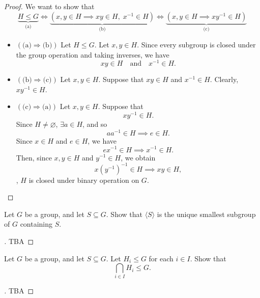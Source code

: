 \documentclass[11pt,openany]{article}
\begin{document}
\begin{proof}
We want to show that \[
\underbrace{H\leq G}_{\text{(a)}}\iff \underbrace{\left(x,y\in H\implies xy\in H,\; x^{-1}\in H\right)}_{\text{(b)}}\iff
\underbrace{\left(x,y\in H\implies xy^{-1}\in H\right)}_{\text{(c)}}
\] \vfill
\begin{itemize}
	\item[] $\left(\text{(a)}\Rightarrow\text{(b)}\right)$\; Let $H\leq G$. Let $x,y\in H$. Since every subgroup is closed under the group operation and taking inverses, we have \[
	xy\in H\quad\text{and}\quad x^{-1}\in H.
	\]\vfill
	\item[] $\left(\text{(b)}\Rightarrow\text{(c)}\right)$\; Let $x,y\in H$. Suppose that $xy\in H$ and $x^{-1}\in H.$ Clearly, $xy^{-1}\in H$.\vfill
	\item[] $\left(\text{(c)}\Rightarrow\text{(a)}\right)$\; Let $x,y\in H$. Suppose that \[
	xy^{-1}\in H.
	\] Since $H\neq\varnothing$, $\exists a\in H$, and so \[
	aa^{-1}\in H\implies e\in H.
	\] Since $x\in H$ and $e\in H$, we have \[
	ex^{-1}\in H\implies x^{-1}\in H.
	\] Then, since $x,y\in H$ and $y^{-1}\in H$, we obtain \[
	x(y^{-1})^{-1}\in H\implies xy\in H,
	\] \ie, $H$ is closed under binary operation on $G$.
\end{itemize}
\end{proof}

\newpage
{}
\begin{exercise*}
Let $G$ be a group, and let $S\subseteq G$. Show that \(\langle S \rangle\) is the unique smallest subgroup of \( G \) containing \( S \).
\end{exercise*}
\begin{proof}[\sol]
	TBA
\end{proof}
\begin{exercise*}
Let $G$ be a group, and let $S\subseteq G$. Let $H_i\leq G$ for each $i\in I$. Show that \[
\bigcap_{i\in I} H_i\leq G.
\]
\end{exercise*}
\begin{proof}[\sol]
TBA
\end{proof}
\end{document}

